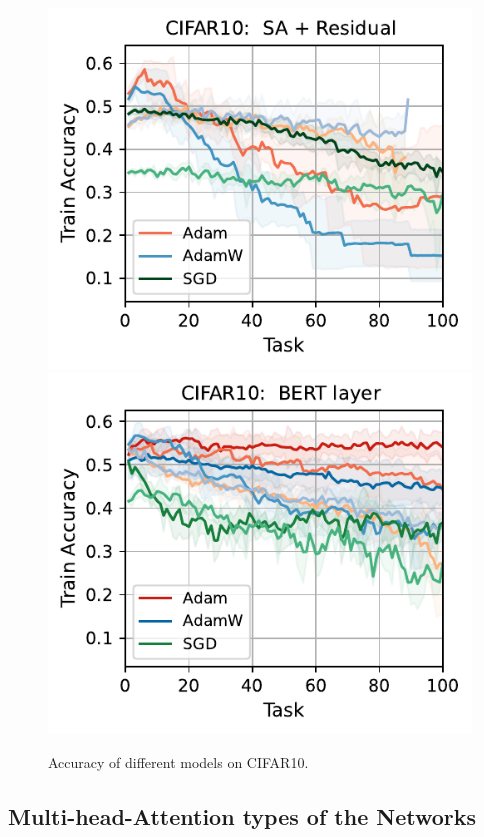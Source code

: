 \begin{figure}[t]
{    \includegraphics[width=\textwidth]{figs/Accuracy/image/attention_residual/cifar10_40.pdf}
    \includegraphics[width=\textwidth]{figs/Accuracy/image/bert_layer/cifar10_40.pdf}
    }
    \caption{Accuracy of different models on CIFAR10.}
    \label{fig:image_models}
\end{figure}



\subsection{Multi-head-Attention types of the Networks}

